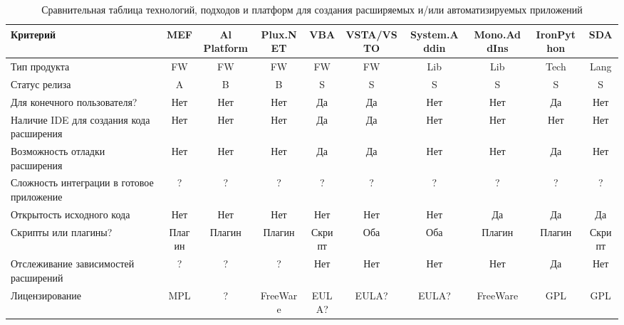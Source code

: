 \begin{landscape}

\begin{table}[H]
  \caption{Сравнительная таблица технологий, подходов и платформ для создания расширяемых и/или автоматизируемых приложений}
  \label{tabular:tech_compare_tab}
  \begin{center}
  \begin{tabular}{|p{4.5cm}|c|c|c|c|c|c|c|c|c|}
  
    \hline
      Критерий &
      MEF &
      Al Platform &
      Plux.NET &
      VBA &
      VSTA/VSTO &
      System.Addin &
      Mono.AddIns &
      IronPython &
      SDA \\
    \hline
      Тип продукта &
      FW &
      FW &
      FW &
      FW &
      FW &
      Lib &
      Lib &
      Tech &
      Lang \\
    \hline
      Статус релиза &
      A &
      B &
      B &
      S &
      S &
      S &
      S &
      S &
      S \\
    \hline
      Для конечного пользователя? &
      Нет &
      Нет &
      Нет &
      Да &
      Да &
      Нет &
      Нет &
      Да &
      Нет \\
    \hline
      Наличие IDE для создания кода расширения &
      Нет &
      Нет &
      Нет &
      Да &
      Да &
      Нет &
      Нет &
      Нет &
      Нет \\
    \hline
      Возможность отладки расширения &
      Нет &
      Нет &
      Нет &
      Да &
      Да &
      Нет &
      Нет &
      Да &
      Нет \\
    \hline
      Сложность интеграции в готовое приложение &
      ? &
      ? &
      ? &
      ? &
      ? &
      ? &
      ? &
      ? &
      ? \\
    \hline
      Открытость исходного кода &
      Нет &
      Нет &
      Нет &
      Нет &
      Нет &
      Нет &
      Да &
      Да &
      Да \\
    \hline
      Скрипты или плагины? &
      Плагин &
      Плагин &
      Плагин &
      Скрипт &
      Оба &
      Оба &
      Плагин &
      Плагин &
      Скрипт \\
    \hline
      Отслеживание зависимостей расширений &
      ? &
      ? &
      ? &
      Нет &
      Нет &
      Нет &
      Нет &
      Да &
      Нет \\
    \hline
      Лицензирование &
      MPL &
      ? &
      FreeWare &
      EULA? &
      EULA? &
      EULA? &
      FreeWare &
      GPL &
      GPL \\
    \hline
    
  \end{tabular}
  \end{center}
\end{table}

\end{landscape}
